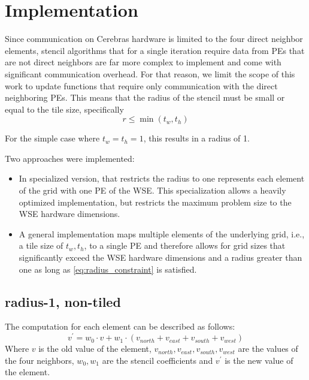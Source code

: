 \chapter{Implementation}
Since communication on Cerebras hardware is limited to the four direct neighbor elements, stencil algorithms that for a single iteration require data from PEs that are not direct neighbors are far more complex to implement and come with significant communication overhead. For that reason, we limit the scope of this work to update functions that require only communication with the direct neighboring PEs. This means that the radius of the stencil must be small or equal to the tile size, specifically
\begin{equation}    
\label{eq:radius_constraint}
r \leq \min(t_w, t_h)
\end{equation}

For the simple case where $t_w=t_h=1$, this results in a radius of 1.

Two approaches were implemented:
\begin{itemize}
    \item In specialized version, that restricts the radius to one represents each element of the grid with one PE of the WSE. This specialization allows a heavily optimized implementation, but restricts the maximum problem size to the WSE hardware dimensions.
    \item A general implementation maps multiple elements of the underlying grid, i.e., a tile size of $t_w, t_h$, to a single PE and therefore allows for grid sizes that significantly exceed the WSE hardware dimensions and a radius greater than one as long as \autoref{eq:radius_constraint} is satisfied. 
\end{itemize}

\section{radius-1, non-tiled}
The computation for each element can be described as follows:
\begin{equation}
    \label{eq:stencil_computation}
    v^{'} = w_0 \cdot v + w_1 \cdot (v_{north} + v_{east} + v_{south} + v_{west})
\end{equation}
Where $v$ is the old value of the element, $v_{north}, v_{east}, v_{south}, v_{west}$ are the values of the four neighbors, $w_0, w_1$ are the stencil coefficients and $v^'$ is the new value of the element.

